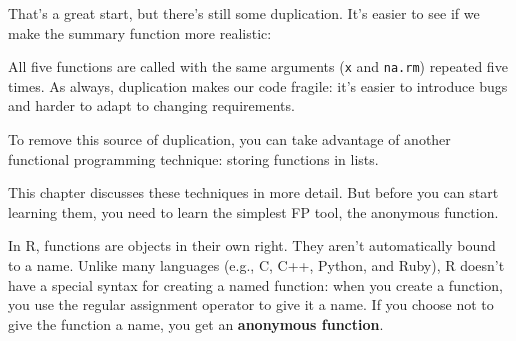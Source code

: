 That's a great start, but there's still some duplication. It's easier to
see if we make the summary function more realistic:

\begin{Shaded}
\begin{Highlighting}[]
\StringTok{ }
 \NormalTok{(} \NormalTok{),}
    \NormalTok{),}
    \NormalTok{),}
    \NormalTok{),}
    \NormalTok{))}
\NormalTok{\}}
\end{Highlighting}
\end{Shaded}

All five functions are called with the same arguments (\texttt{x} and
\texttt{na.rm}) repeated five times. As always, duplication makes our
code fragile: it's easier to introduce bugs and harder to adapt to
changing requirements.

To remove this source of duplication, you can take advantage of another
functional programming technique: storing functions in lists.

\begin{Shaded}
\begin{Highlighting}[]
\StringTok{ }
  \StringTok{ }
   \NormalTok{))}
\NormalTok{\}}
\end{Highlighting}
\end{Shaded}

This chapter discusses these techniques in more detail. But before you
can start learning them, you need to learn the simplest FP tool, the
anonymous function.


In R, functions are objects in their own right. They aren't
automatically bound to a name. Unlike many languages (e.g., C, C++,
Python, and Ruby), R doesn't have a special syntax for creating a named
function: when you create a function, you use the regular assignment
operator to give it a name. If you choose not to give the function a
name, you get an \textbf{anonymous function}.
 

